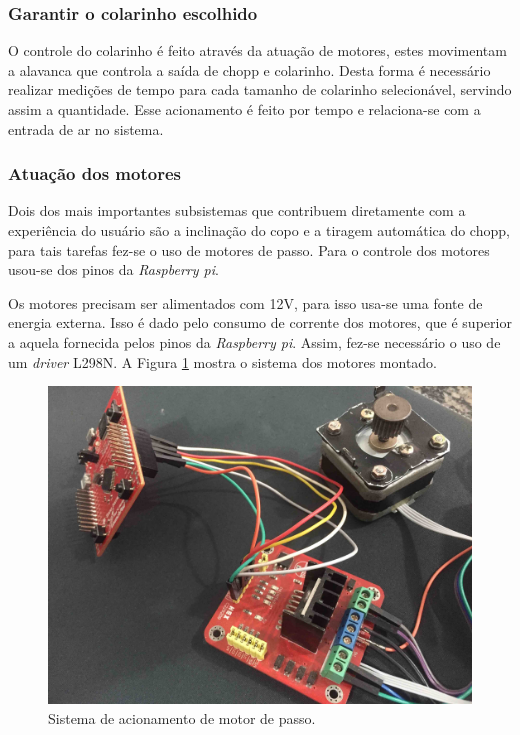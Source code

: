 \subsubsection{Garantir o colarinho escolhido}
O controle do colarinho é feito através da atuação de motores, estes  movimentam
a alavanca que controla a saída de chopp e colarinho. Desta forma é necessário realizar 
medições de tempo para cada tamanho de colarinho selecionável, servindo assim a quantidade. 
Esse acionamento é feito por tempo e relaciona-se com a entrada de ar no  sistema.


\subsubsection{Atuação dos motores}
Dois dos mais importantes subsistemas que contribuem diretamente com a experiência do usuário são 
a inclinação do copo e a tiragem automática do chopp, para tais tarefas fez-se o uso de motores de passo.
Para o controle dos motores usou-se dos pinos da \textit{Raspberry pi}.

Os motores precisam ser alimentados com 12V, para isso usa-se uma fonte de energia externa. Isso é dado pelo
 consumo de corrente dos motores, que é superior a aquela fornecida pelos pinos da \textit{Raspberry pi}. Assim,
fez-se necessário o uso de um \textit{driver} L298N. A Figura \ref{motor} mostra o sistema dos motores montado.

\begin{figure}[!h]
            \centering
         	\includegraphics[scale= 0.08]{figuras/motor.jpg}
            \caption{Sistema de acionamento de motor de passo.}
            \label{motor}
\end{figure}


